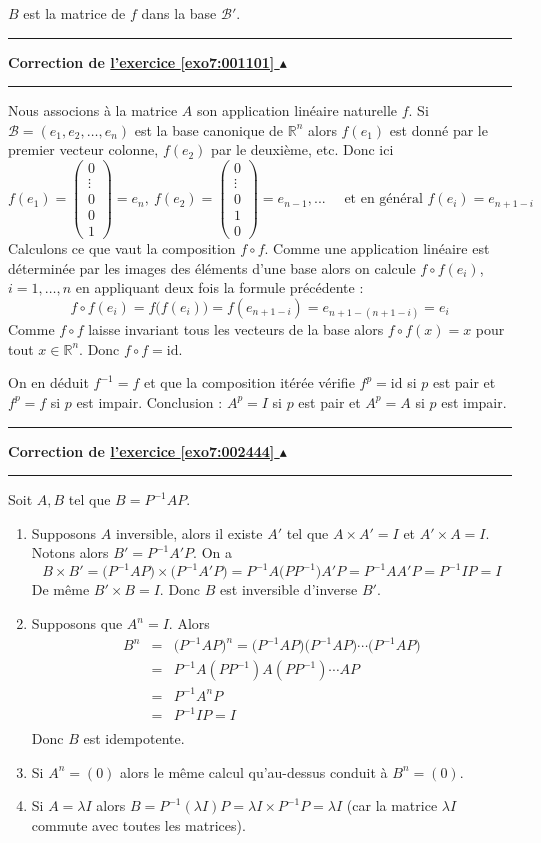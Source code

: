 \documentclass[11pt,a4paper]{article}
\newcommand{\Rr}{\mathbb{R}} \newcommand{\R}{\mathbb{R}}
\newcounter{exo}
\newcommand{\correction}[1]{\hypertarget{cor7:#1}{}\label{cor7:#1}{\bf Correction de \hyperlink{exo7:#1}{l'exercice \ref{exo7:#1} $\blacktriangle$}}\vspace{1mm}\hrule\vspace{1mm}}
\newcommand{\fincorrection}{\vspace{1mm}\hrule\vspace*{7mm}}
\begin{document}
$B$ est la matrice de $f$ dans la base $\mathcal{B}'$.
\fincorrection
\correction{001101}
Nous associons à la matrice $A$ son application linéaire naturelle $f$.
Si $\mathcal{B}=(e_1,e_2,\ldots,e_n)$ est la base canonique de $\Rr^n$
alors $f(e_1)$ est donné par le premier vecteur colonne, $f(e_2)$ par le deuxième, etc.
Donc ici 
$$f(e_1)=\begin{pmatrix}0\\ \vdots \\ 0 \\ 0 \\ 1 \end{pmatrix}=e_n, \
f(e_2)= \begin{pmatrix}0\\ \vdots \\ 0 \\ 1 \\0 \end{pmatrix}=e_{n-1},...  \quad \text{ et en général }
f(e_i) = e_{n+1-i}$$ 
Calculons ce que vaut la composition $f\circ f$.
Comme une application linéaire est déterminée par
 les images des éléments d'une base alors
on calcule $f\circ f(e_i)$, $i=1,\ldots,n$ en appliquant deux fois la formule précédente :
$$f\circ f(e_i) = f\big( f(e_i) \big) =  f(e_{n+1-i})=e_{n+1-(n+1-i)}=e_i$$
Comme $f\circ f$ laisse invariant tous les vecteurs de la base alors
$f\circ f (x)=x$ pour tout $x\in \Rr^n$. Donc $f\circ f=\mathrm{id}$.

On en déduit $f^{-1}=f$ et que la composition itérée vérifie $f^{p}=\mathrm{id}$ si $p$ est pair
et $f^{p}=f$ si $p$ est impair.
Conclusion : $A^p=I$ si $p$ est pair et $A^p=A$ si $p$ est impair.


\fincorrection
\correction{002444}
Soit $A,B$ tel que $B = P^{-1} A P$.
\begin{enumerate}
  \item Supposons $A$ inversible, alors il existe $A'$ tel que $A\times A'=I$ et $A'\times A=I$.
Notons alors $B'= P^{-1} A'P$. On a
$$B \times B' = \big(P^{-1}A P \big)\times \big(P^{-1} A' P\big)=P^{-1}A \big(P P^{-1}\big)A' P 
= P^{-1}A A' P=P^{-1} I P=I$$
De même $B' \times B=I$. Donc $B$ est inversible d'inverse $B'$.

  \item Supposons que $A^n=I$. Alors 
$$\begin{array}{rcl}
B^n 
&=&\big(P^{-1} A P\big)^n= \big(P^{-1} A P \big)\big(P^{-1} A P \big)\cdots \big(P^{-1} A P \big) \\
&=&P^{-1} A (P P^{-1}) A (P P^{-1}) \cdots  A P \\
&=& P^{-1} A^n P  \\
&=& P^{-1} I P = I \\
\end{array}$$
Donc $B$ est idempotente.

  \item Si $A^n=(0)$ alors le même calcul qu'au-dessus conduit à $B^n=(0)$.

  \item Si $A = \lambda I$ alors $B=P^{-1} (\lambda I) P = \lambda I \times P^{-1}P= \lambda I$
(car la matrice $\lambda I$ commute avec toutes les matrices).
\end{enumerate}
\end{document}
